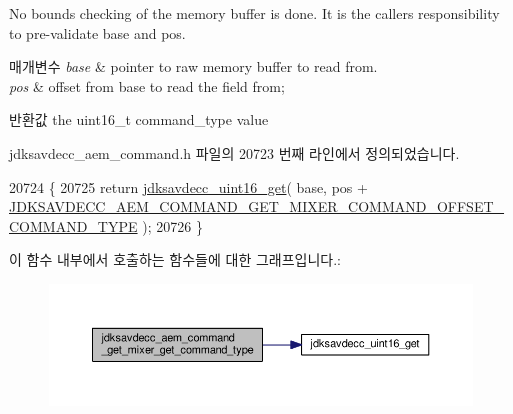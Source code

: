 No bounds checking of the memory buffer is done. It is the caller\textquotesingle{}s responsibility to pre-\/validate base and pos.


\begin{DoxyParams}{매개변수}
{\em base} & pointer to raw memory buffer to read from. \\
\hline
{\em pos} & offset from base to read the field from; \\
\hline
\end{DoxyParams}
\begin{DoxyReturn}{반환값}
the uint16\+\_\+t command\+\_\+type value 
\end{DoxyReturn}


jdksavdecc\+\_\+aem\+\_\+command.\+h 파일의 20723 번째 라인에서 정의되었습니다.


\begin{DoxyCode}
20724 \{
20725     \textcolor{keywordflow}{return} \hyperlink{group__endian_ga3fbbbc20be954aa61e039872965b0dc9}{jdksavdecc\_uint16\_get}( base, pos + 
      \hyperlink{group__command__get__mixer_gaba98dbb05aa68c43723a0302f3c61016}{JDKSAVDECC\_AEM\_COMMAND\_GET\_MIXER\_COMMAND\_OFFSET\_COMMAND\_TYPE}
       );
20726 \}
\end{DoxyCode}


이 함수 내부에서 호출하는 함수들에 대한 그래프입니다.\+:
\nopagebreak
\begin{figure}[H]
\begin{center}
\leavevmode
\includegraphics[width=350pt]{group__command__get__mixer_ga025621cdd25992ed588f50195965886d_cgraph}
\end{center}
\end{figure}



